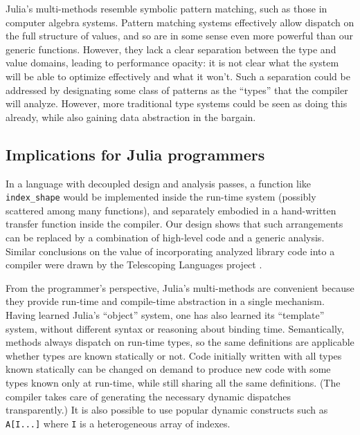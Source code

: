 \documentclass[preprint]{sigplanconf}
\newcommand{\code}[1]{\texttt{#1}}
\begin{document}
Julia's multi-methods resemble symbolic pattern matching, such as those in
computer algebra systems. Pattern matching systems effectively
allow dispatch on the full structure of values, and so are in some sense
even more powerful than our generic functions. However, they lack a clear
separation between the type and value domains, leading to performance
opacity: it is not clear what the system will be able to optimize
effectively and what it won't.
Such a separation could be addressed by
designating some class of patterns as the ``types'' that the compiler
will analyze. However, more traditional type systems could be seen as
doing this already, while also gaining data abstraction in the bargain.

\subsection{Implications for Julia programmers}

In a language with decoupled design and analysis passes, a function like
\code{index\_shape} would be implemented inside the run-time system
(possibly scattered among many functions), and separately embodied in
a hand-written transfer function inside the compiler. Our design shows
that such arrangements can be replaced by a combination of high-level code and
a generic analysis. Similar conclusions on the value of incorporating analyzed library code into a
compiler were drawn by the Telescoping Languages project \cite{telescoping}.

From the programmer's perspective, Julia's multi-methods are convenient
because they provide run-time and compile-time abstraction in a single
mechanism. Having learned Julia's ``object'' system, one has also learned
its ``template'' system, without different syntax or reasoning about
binding time. Semantically, methods always dispatch on run-time
types, so the same definitions are applicable whether types are known
statically or not. Code initially written with all types
known statically can be changed on demand to produce new code with some types
known only at run-time, while still sharing all the same definitions. (The compiler
takes care of generating the necessary dynamic dispatches transparently.)
It is also possible to use popular
dynamic constructs such as \code{A[I...]} where \code{I} is a heterogeneous
array of indexes.
\end{document}
